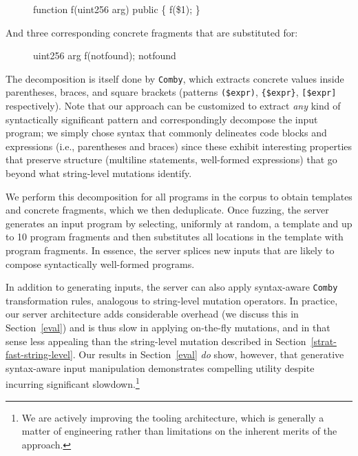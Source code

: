 \begin{figure}[ht!]
  {\scriptsize
\begin{code}
function f(uint256 arg) public \{
    f(\$1);
\} 
\end{code}
}
\end{figure}

And three corresponding concrete fragments that are substituted for:

\begin{figure}[ht!]
  {\scriptsize
\begin{code}
uint256 arg
f(notfound);
notfound
\end{code}
}
\end{figure}

The decomposition is itself done by \texttt{Comby}, which extracts concrete
values inside parentheses, braces, and square brackets (patterns
\texttt{(\$expr)}, \texttt{\{\$expr\}}, \texttt{[\$expr]} respectively). Note
that our approach can be customized to extract \emph{any} kind of syntactically
significant pattern and correspondingly decompose the input program; we simply
chose syntax that commonly delineates code blocks and expressions (i.e.,
parentheses and braces) since these exhibit interesting properties that
preserve structure (multiline statements, well-formed expressions) that go
beyond what string-level mutations identify.

We perform this decomposition for all programs in the corpus to obtain
templates and concrete fragments, which we then deduplicate. Once fuzzing, the
server generates an input program by selecting, uniformly at random, a template
and up to 10 program fragments and then substitutes all locations in the
template with program fragments. In essence, the server splices new inputs that
are likely to compose syntactically well-formed programs.

In addition to generating inputs, the server can also apply syntax-aware
\texttt{Comby} transformation rules, analogous to string-level mutation
operators. In practice, our server architecture adds considerable overhead (we
discuss this in Section~\ref{eval}) and is thus slow in applying
on-the-fly mutations, and in that sense less
appealing than the string-level mutation described in Section~\ref{strat-fast-string-level}. Our
results in Section~\ref{eval} \emph{do} show, however, that generative
syntax-aware input manipulation demonstrates compelling utility despite
incurring significant slowdown.\footnote{We are actively improving the tooling
architecture, which is generally a matter of engineering rather than
limitations on the inherent merits of the approach.}

